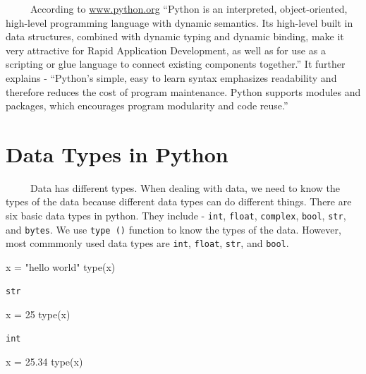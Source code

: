 \documentclass[
  letterpaper,
  DIV=11,
  numbers=noendperiod]{scrreprt}
\newenvironment{Shaded}{\begin{snugshade}}{\end{snugshade}}
\newcommand{\BuiltInTok}[1]{\textcolor[rgb]{0.00,0.23,0.31}{#1}}
\newcommand{\DecValTok}[1]{\textcolor[rgb]{0.68,0.00,0.00}{#1}}
\newcommand{\FloatTok}[1]{\textcolor[rgb]{0.68,0.00,0.00}{#1}}
\newcommand{\NormalTok}[1]{\textcolor[rgb]{0.00,0.23,0.31}{#1}}
\newcommand{\OperatorTok}[1]{\textcolor[rgb]{0.37,0.37,0.37}{#1}}
\newcommand{\StringTok}[1]{\textcolor[rgb]{0.13,0.47,0.30}{#1}}
\begin{document}
~~~~~According to \url{www.python.org} ``Python is an interpreted,
object-oriented, high-level programming language with dynamic semantics.
Its high-level built in data structures, combined with dynamic typing
and dynamic binding, make it very attractive for Rapid Application
Development, as well as for use as a scripting or glue language to
connect existing components together.'' It further explains - ``Python's
simple, easy to learn syntax emphasizes readability and therefore
reduces the cost of program maintenance. Python supports modules and
packages, which encourages program modularity and code reuse.''

\section{Data Types in Python}\label{data-types-in-python}

~~~~~Data has different types. When dealing with data, we need to know
the types of the data because different data types can do different
things. There are six basic data types in python. They include -
\texttt{int}, \texttt{float}, \texttt{complex}, \texttt{bool},
\texttt{str}, and \texttt{bytes}. We use \texttt{type\ ()} function to
know the types of the data. However, most commmonly used data types are
\texttt{int}, \texttt{float}, \texttt{str}, and \texttt{bool}.

\begin{Shaded}
\begin{Highlighting}[]
\NormalTok{x }\OperatorTok{=} \StringTok{"hello world"}
\BuiltInTok{type}\NormalTok{(x)}
\end{Highlighting}
\end{Shaded}

\begin{verbatim}
str
\end{verbatim}

\begin{Shaded}
\begin{Highlighting}[]
\NormalTok{x }\OperatorTok{=} \DecValTok{25}
\BuiltInTok{type}\NormalTok{(x)}
\end{Highlighting}
\end{Shaded}

\begin{verbatim}
int
\end{verbatim}

\begin{Shaded}
\begin{Highlighting}[]
\NormalTok{x }\OperatorTok{=} \FloatTok{25.34}
\BuiltInTok{type}\NormalTok{(x)}
\end{Highlighting}
\end{Shaded}
\end{document}
